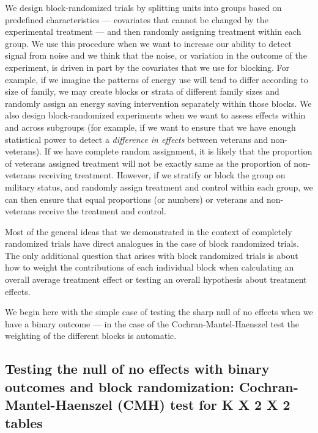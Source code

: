 \documentclass[
  12pt,
]{book}
\theoremstyle{definition}
\theoremstyle{definition}
\theoremstyle{definition}
\theoremstyle{remark}
\begin{document}
We design block-randomized trials by splitting units into groups based
on predefined characteristics --- covariates that cannot be changed by
the experimental treatment --- and then randomly assigning treatment
within each group. We use this procedure when we want to increase our
ability to detect signal from noise and we think that the noise, or
variation in the outcome of the experiment, is driven in part by the
covariates that we use for blocking. For example, if we imagine the
patterns of energy use will tend to differ according to size of family,
we may create blocks or strata of different family sizes and randomly
assign an energy saving intervention separately within those blocks. We
also design block-randomized experiments when we want to assess effects
within and across subgroups (for example, if we want to ensure that we
have enough statistical power to detect a \emph{difference in effects}
between veterans and non-veterans). If we have complete random
assignment, it is likely that the proportion of veterans assigned
treatment will not be exactly same as the proportion of non-veterans
receiving treatment. However, if we stratify or block the group on
military status, and randomly assign treatment and control within each
group, we can then ensure that equal proportions (or numbers) or
veterans and non-veterans receive the treatment and control.

Most of the general ideas that we demonstrated in the context of
completely randomized trials have direct analogues in the case of block
randomized trials. The only additional question that arises with block
randomized trials is about how to weight the contributions of each
individual block when calculating an overall average treatment effect or
testing an overall hypothesis about treatment effects.

We begin here with the simple case of testing the sharp null of no
effects when we have a binary outcome --- in the case of the
Cochran-Mantel-Haenszel test the weighting of the different blocks is
automatic.

\hypertarget{testing-the-null-of-no-effects-with-binary-outcomes-and-block-randomization-cochran-mantel-haenszel-cmh-test-for-k-x-2-x-2-tables}{%
\subsection{Testing the null of no effects with binary outcomes and
block randomization: Cochran-Mantel-Haenszel (CMH) test for K X 2 X 2
tables}\label{testing-the-null-of-no-effects-with-binary-outcomes-and-block-randomization-cochran-mantel-haenszel-cmh-test-for-k-x-2-x-2-tables}}
\end{document}
